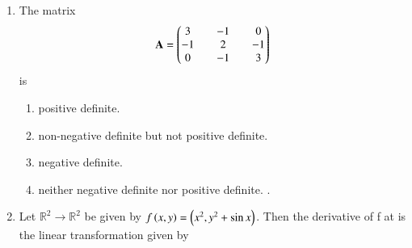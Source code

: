 \renewcommand{\theequation}{\theenumi}
\renewcommand{\thefigure}{\theenumi}
\renewcommand{\thetable}{\theenumi}
\begin{enumerate}[label=\thesection.\arabic*.,ref=\thesection.\theenumi]

\item The matrix
\begin{align}
\mathbf{A} = \begin{pmatrix}3 && -1 && 0 \\ -1 && 2 && -1\\ 0 && -1 && 3\end{pmatrix}
\end{align}
is
\begin{enumerate}
\item positive definite.
\item non-negative definite but not positive definite.
\item negative definite. 
\item neither negative definite nor positive definite. .
\end{enumerate}
%
\solution

\item Let $\mathbb{R}^2\xrightarrow{}\mathbb{R}^2$ be given 
by $f\left(x,y\right)= \left(x^2,y^2+\sin x\right)$. Then the derivative of f at  is the 
linear transformation given by


\end{enumerate}
